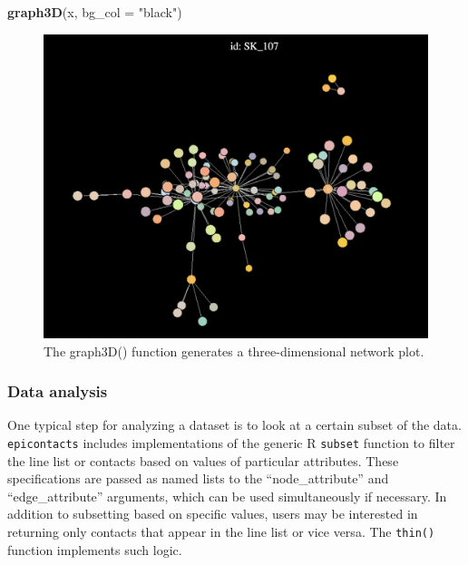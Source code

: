 \documentclass[9pt,a4paper,]{extarticle}
\newenvironment{Shaded}{\begin{snugshade}}{\end{snugshade}}
\newcommand{\KeywordTok}[1]{\textcolor[rgb]{0.13,0.29,0.53}{\textbf{#1}}}
\newcommand{\DataTypeTok}[1]{\textcolor[rgb]{0.13,0.29,0.53}{#1}}
\newcommand{\StringTok}[1]{\textcolor[rgb]{0.31,0.60,0.02}{#1}}
\newcommand{\NormalTok}[1]{#1}
\theoremstyle{definition}
\theoremstyle{definition}
\theoremstyle{definition}
\theoremstyle{remark}
\begin{document}
\begin{Shaded}
\begin{Highlighting}[]
\KeywordTok{graph3D}\NormalTok{(x, }\DataTypeTok{bg_col =} \StringTok{"black"}\NormalTok{)}
\end{Highlighting}
\end{Shaded}

\begin{figure}
\centering
\includegraphics[width=1.00000\textwidth]{figure3.png}
\caption{The graph3D() function generates a three-dimensional network plot.}
\end{figure}

\subsubsection{Data analysis}\label{data-analysis}

One typical step for analyzing a dataset is to look at a certain subset of the data. \texttt{epicontacts} includes implementations of the generic R \texttt{subset} function to filter the line list or contacts based on values of particular attributes. These specifications are passed as named lists to the ``node\_attribute'' and ``edge\_attribute'' arguments, which can be used simultaneously if necessary. In addition to subsetting based on specific values, users may be interested in returning only contacts that appear in the line list or vice versa. The \texttt{thin()} function implements such logic.
\end{document}
